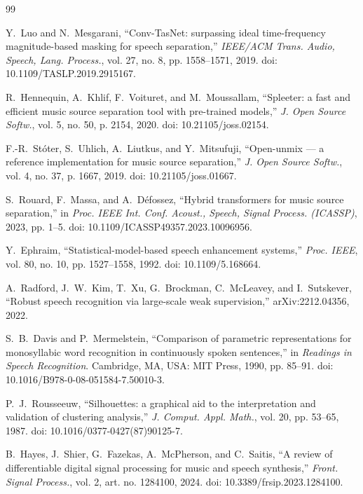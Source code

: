 \documentclass[conference]{IEEEtran}
\begin{document}
\begin{thebibliography}{99}

Y.~Luo and N.~Mesgarani, ``Conv-TasNet: surpassing ideal time-frequency
magnitude-based masking for speech separation,'' \emph{IEEE/ACM Trans. Audio,
Speech, Lang. Process.}, vol. 27, no. 8, pp. 1558--1571, 2019.
doi: 10.1109/TASLP.2019.2915167.

R.~Hennequin, A.~Khlif, F.~Voituret, and M.~Moussallam, ``Spleeter: a fast and
efficient music source separation tool with pre-trained models,''
\emph{J. Open Source Softw.}, vol. 5, no. 50, p. 2154, 2020.
doi: 10.21105/joss.02154.

F.-R.~St{\'o}ter, S.~Uhlich, A.~Liutkus, and Y.~Mitsufuji, ``Open-unmix --- a
reference implementation for music source separation,'' \emph{J. Open Source
Softw.}, vol. 4, no. 37, p. 1667, 2019. doi: 10.21105/joss.01667.

S.~Rouard, F.~Massa, and A.~D{\'e}fossez, ``Hybrid transformers for music
source separation,'' in \emph{Proc. IEEE Int. Conf. Acoust., Speech, Signal
Process. (ICASSP)}, 2023, pp. 1--5. doi: 10.1109/ICASSP49357.2023.10096956.

Y.~Ephraim, ``Statistical-model-based speech enhancement systems,''
\emph{Proc. IEEE}, vol. 80, no. 10, pp. 1527--1558, 1992.
doi: 10.1109/5.168664.

A.~Radford, J.~W.~Kim, T.~Xu, G.~Brockman, C.~McLeavey, and I.~Sutskever,
``Robust speech recognition via large-scale weak supervision,'' arXiv:2212.04356,
2022.

S.~B.~Davis and P.~Mermelstein, ``Comparison of parametric representations for
monosyllabic word recognition in continuously spoken sentences,'' in
\emph{Readings in Speech Recognition}. Cambridge, MA, USA: MIT Press, 1990,
pp. 85--91. doi: 10.1016/B978-0-08-051584-7.50010-3.

P.~J.~Rousseeuw, ``Silhouettes: a graphical aid to the interpretation and
validation of clustering analysis,'' \emph{J. Comput. Appl. Math.}, vol. 20,
pp. 53--65, 1987. doi: 10.1016/0377-0427(87)90125-7.

B.~Hayes, J.~Shier, G.~Fazekas, A.~McPherson, and C.~Saitis, ``A review of
differentiable digital signal processing for music and speech synthesis,''
\emph{Front. Signal Process.}, vol. 2, art. no. 1284100, 2024.
doi: 10.3389/frsip.2023.1284100.


\end{thebibliography}
\end{document}
